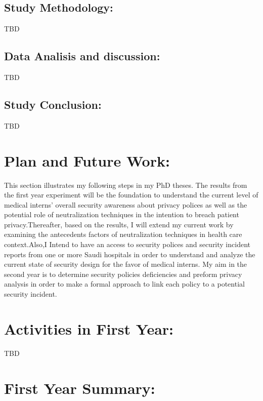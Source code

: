 \subsection{Study Methodology:}
TBD
\subsection{Data Analisis and discussion:}
TBD
\subsection{Study Conclusion:}
TBD

\section{Plan and Future Work:}
This section illustrates my following steps in my PhD theses. The results from the first year experiment will be the foundation to understand the current level of medical interns' overall security awareness about privacy polices as well as the potential role of neutralization techniques in the intention to breach patient privacy.Thereafter, based on the results, I will extend my current work by examining the antecedents factors of neutralization techniques in health care context.Also,I Intend to have an access to security  polices and security incident reports from one or more Saudi hospitals in order to understand and analyze the current state of security design for the favor of medical interns. My aim in the second year is to determine security policies deficiencies and preform privacy analysis in order to make a formal approach to link each policy to a potential security incident.
  
\section{Activities in First Year:}
TBD


\section{First Year Summary:}
